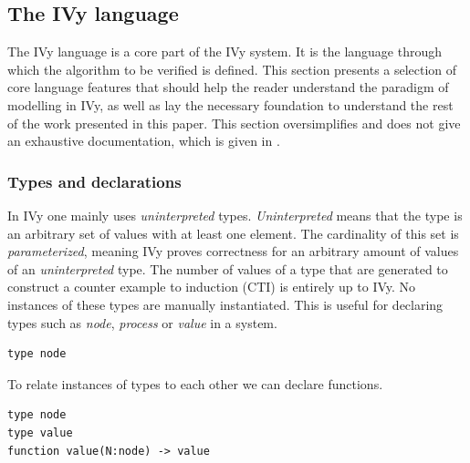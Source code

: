 \documentclass[fleqn]{article}
\begin{document}
\subsection{The IVy language}
The IVy language is a core part of the IVy system. It is the language through which the algorithm to be verified is defined.
This section presents a selection of core language features that should help the reader understand the paradigm of modelling in IVy, as well as lay the necessary foundation to understand
the rest of the work presented in this paper. This section oversimplifies and does not give an exhaustive documentation, which is given in \cite{refLanguageDoc}.

\subsubsection{Types and declarations}
In IVy one mainly uses \textit{uninterpreted} types. \textit{Uninterpreted} means that the type is an arbitrary set of values with at least one element.
The cardinality of this set is \textit{parameterized}, meaning IVy proves correctness for an arbitrary amount of values of an \textit{uninterpreted} type.
The number of values of a type that are generated to construct a counter example to induction (CTI) is entirely up to IVy. No instances of these types are manually instantiated.
This is useful for declaring types such as \textit{node}, \textit{process} or \textit{value} in a system.

\begin{mdframed}[nobreak=true, backgroundcolor=light-gray, roundcorner=10pt,leftmargin=1, rightmargin=1, innerleftmargin=15, innertopmargin=15,innerbottommargin=15, outerlinewidth=1, linecolor=light-gray]
\begin{lstlisting}
type node
\end{lstlisting}
\end{mdframed}

\noindent To relate instances of types to each other we can declare functions.

\begin{mdframed}[nobreak=true, backgroundcolor=light-gray, roundcorner=10pt,leftmargin=1, rightmargin=1, innerleftmargin=15, innertopmargin=15,innerbottommargin=15, outerlinewidth=1, linecolor=light-gray]
\begin{lstlisting}
type node
type value
function value(N:node) -> value
\end{lstlisting}
\end{mdframed}
\end{document}
